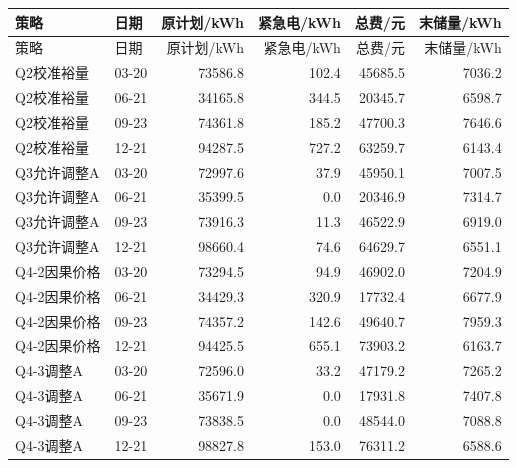 \small\begin{longtable}{llrrrr}\toprule 策略 & 日期 & 原计划/kWh & 紧急电/kWh & 总费/元 & 末储量/kWh\\\midrule\endfirsthead
\toprule 策略 & 日期 & 原计划/kWh & 紧急电/kWh & 总费/元 & 末储量/kWh\\\midrule\endhead
Q2校准裕量 & 03-20 & 73586.8 & 102.4 & 45685.5 & 7036.2\\
Q2校准裕量 & 06-21 & 34165.8 & 344.5 & 20345.7 & 6598.7\\
Q2校准裕量 & 09-23 & 74361.8 & 185.2 & 47700.3 & 7646.6\\
Q2校准裕量 & 12-21 & 94287.5 & 727.2 & 63259.7 & 6143.4\\
Q3允许调整A & 03-20 & 72997.6 & 37.9 & 45950.1 & 7007.5\\
Q3允许调整A & 06-21 & 35399.5 & 0.0 & 20346.9 & 7314.7\\
Q3允许调整A & 09-23 & 73916.3 & 11.3 & 46522.9 & 6919.0\\
Q3允许调整A & 12-21 & 98660.4 & 74.6 & 64629.7 & 6551.1\\
Q4-2因果价格 & 03-20 & 73294.5 & 94.9 & 46902.0 & 7204.9\\
Q4-2因果价格 & 06-21 & 34429.3 & 320.9 & 17732.4 & 6677.9\\
Q4-2因果价格 & 09-23 & 74357.2 & 142.6 & 49640.7 & 7959.3\\
Q4-2因果价格 & 12-21 & 94425.5 & 655.1 & 73903.2 & 6163.7\\
Q4-3调整A & 03-20 & 72596.0 & 33.2 & 47179.2 & 7265.2\\
Q4-3调整A & 06-21 & 35671.9 & 0.0 & 17931.8 & 7407.8\\
Q4-3调整A & 09-23 & 73838.5 & 0.0 & 48544.0 & 7088.8\\
Q4-3调整A & 12-21 & 98827.8 & 153.0 & 76311.2 & 6588.6\\
\bottomrule\end{longtable}
